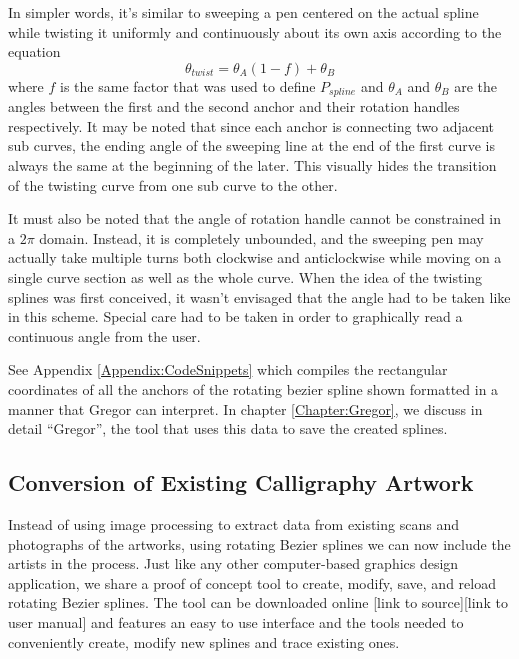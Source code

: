     In simpler words, it’s similar to sweeping a pen centered on the actual spline while twisting it uniformly and continuously about its own axis according to the equation
    \begin{equation}
    \theta_{twist}=\theta_A  (1-f)+ \theta_B
    \end{equation}
    where $f$ is the same factor that was used to define $P_{spline}$ and $\theta_A$ and $\theta_B$ are the angles between the first and the second anchor and their rotation handles respectively. It may be noted that since each anchor is connecting two adjacent sub curves, the ending angle of the sweeping line at the end of the first curve is always the same at the beginning of the later. This visually hides the transition of the twisting curve from one sub curve to the other.

    It must also be noted that the angle of rotation handle cannot be constrained in a $2\pi$ domain. Instead, it is completely unbounded, and the sweeping pen may actually take multiple turns both clockwise and anticlockwise while moving on a single curve section as well as the whole curve. When the idea of the twisting splines was first conceived, it wasn’t envisaged that the angle had to be taken like in this scheme. Special care had to be taken in order to graphically read a continuous angle from the user.

    See Appendix \ref{Appendix:CodeSnippets} which compiles the rectangular coordinates of all the anchors of the rotating bezier spline shown formatted in a manner that Gregor can interpret. In chapter \ref{Chapter:Gregor}, we discuss in detail ``Gregor'', the tool that uses this data to save the created splines.

\subsection{Conversion of Existing Calligraphy Artwork}
Instead of using image processing to extract data from existing scans and photographs of the artworks, using rotating Bezier splines we can now include the artists in the process. Just like any other computer-based graphics design application, we share a proof of concept tool to create, modify, save, and reload rotating Bezier splines. The tool can be downloaded online [link to source][link to user manual] and features an easy to use interface and the tools needed to conveniently create, modify new splines and trace existing ones.

